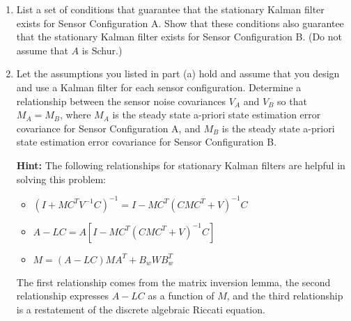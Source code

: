 \begin{enumerate}
    \item
    List a set of conditions that guarantee that the stationary Kalman filter exists for Sensor Configuration A. Show that these conditions also guarantee that the stationary Kalman filter exists for Sensor Configuration B. (Do not assume that $A$ is Schur.)
    
    \item
    Let the assumptions you listed in part (a) hold and assume that you design and use a Kalman filter for each sensor configuration. Determine a relationship between the sensor noise covariances $V_A$ and $V_B$ so that $M_A = M_B$, where $M_A$ is the steady state a-priori state estimation error covariance for Sensor Configuration A, and $M_B$ is the steady state a-priori state estimation error covariance for Sensor Configuration B.
    
    \textbf{Hint:} The following relationships for stationary Kalman filters are helpful in solving this problem:
    \begin{itemize}
        \item
        $(I + MC^T V^{-1} C)^{-1} = I - MC^T (CMC^T + V)^{-1} C$
        
        \item
        $A - LC = A \left[ I - MC^T (CMC^T + V)^{-1} C \right]$
        
        \item
        $M = (A-LC)MA^T + B_w W B_w^T$

    \end{itemize}
    The first relationship comes from the matrix inversion lemma, the second relationship expresses $A-LC$ as a function of $M$, and the third relationship is a restatement of the discrete algebraic Riccati equation.

\end{enumerate}


